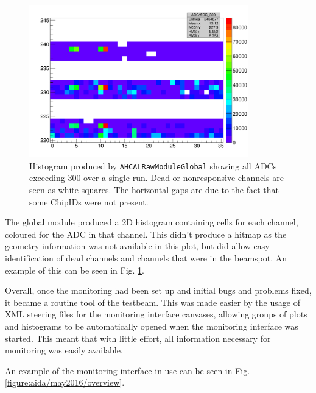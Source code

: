 \begin{figure}[p]
	\centering
	\includegraphics[width=0.85\textwidth]{../Pictures/GlobalModule-May2016.png} %
	\caption{Histogram produced by \texttt{AHCALRawModuleGlobal} showing all \acrshort{ADC}s exceeding 300 over a single run. Dead or nonresponsive channels are seen as white squares. The horizontal gaps are due to the fact that some ChipIDs were not present.}
	\label{figure:aida/may2016/globalmodule}
\end{figure}

The global module produced a 2D histogram containing cells for each channel, coloured for the \acrshort{ADC} in that channel. This didn't produce a hitmap as the geometry information was not available in this plot, but did allow easy identification of dead channels and channels that were in the beamspot. An example of this can be seen in Fig. \ref{figure:aida/may2016/globalmodule}.

Overall, once the monitoring had been set up and initial bugs and problems fixed, it became a routine tool of the testbeam. This was made easier by the usage of \acrshort{XML} steering files for the monitoring interface canvases, allowing groups of plots and histograms to be automatically opened when the monitoring interface was started. This meant that with little effort, all information necessary for monitoring was easily available.

An example of the monitoring interface in use can be seen in Fig. \ref{figure:aida/may2016/overview}.

